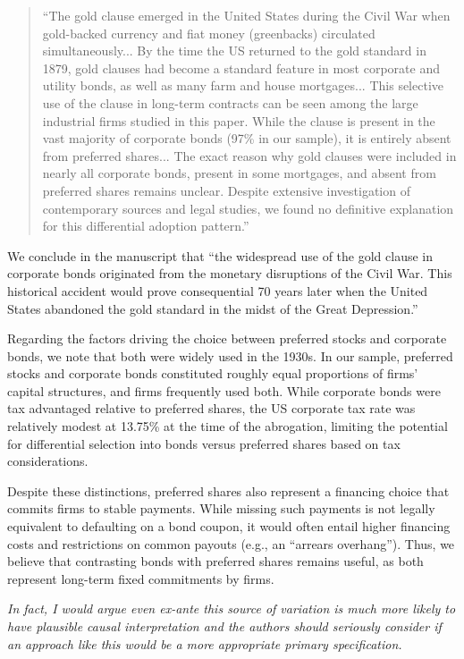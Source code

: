 \begin{itemize}
    \begin{quote}
    ``The gold clause emerged in the United States during the Civil War when gold-backed currency and fiat money (greenbacks) circulated simultaneously... By the time the US returned to the gold standard in 1879, gold clauses had become a standard feature in most corporate and utility bonds, as well as many farm and house mortgages... This selective use of the clause in long-term contracts can be seen among the large industrial firms studied in this paper. While the clause is present in the vast majority of corporate bonds (97\% in our sample), it is entirely absent from preferred shares... The exact reason why gold clauses were included in nearly all corporate bonds, present in some mortgages, and absent from preferred shares remains unclear. Despite extensive investigation of contemporary sources and legal studies, we found no definitive explanation for this differential adoption pattern.''
    \end{quote}
    
    We conclude in the manuscript that ``the widespread use of the gold clause in corporate bonds originated from the monetary disruptions of the Civil War. This historical accident would prove consequential 70 years later when the United States abandoned the gold standard in the midst of the Great Depression.''
    
    Regarding the factors driving the choice between preferred stocks and corporate bonds, we note that both were widely used in the 1930s. In our sample, preferred stocks and corporate bonds constituted roughly equal proportions of firms' capital structures, and firms frequently used both. While corporate bonds were tax advantaged relative to preferred shares, the US corporate tax rate was relatively modest at 13.75\% at the time of the abrogation, limiting the potential for differential selection into bonds versus preferred shares based on tax considerations.

    Despite these distinctions, preferred shares also represent a financing choice that commits firms to stable payments. While missing such payments is not legally equivalent to defaulting on a bond coupon, it would often entail higher financing costs and restrictions on common payouts (e.g., an ``arrears overhang''). Thus, we believe that contrasting bonds with preferred shares remains useful, as both represent long-term fixed commitments by firms.
    
  \textit{\textcolor{red!60!black}{
    In fact, I would argue even ex-ante this source of variation is much more likely to have plausible causal interpretation and the authors should seriously consider if an approach like this would be a more appropriate primary specification.
    }}


\end{itemize}
